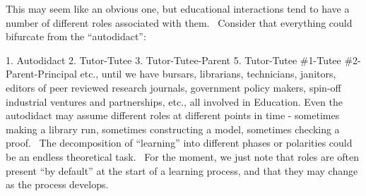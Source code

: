 This may seem like an obvious one, but educational interactions tend to
have a number of different roles associated with them. ~Consider that
everything could bifurcate from the ``autodidact'':

1. Autodidact 2. Tutor-Tutee 3. Tutor-Tutee-Parent 5. Tutor-Tutee
\#1-Tutee \#2-Parent-Principal etc., until we have bursars, librarians,
technicians, janitors, editors of peer reviewed research journals,
government policy makers, spin-off industrial ventures and partnerships,
etc., all involved in Education. Even the autodidact may assume
different roles at different points in time - sometimes making a library
run, sometimes constructing a model, sometimes checking a proof. ~The
decomposition of ``learning'' into different phases or polarities could
be an endless theoretical task. ~For the moment, we just note that roles
are often present ``by default'' at the start of a learning process, and
that they may change as the process develops.
